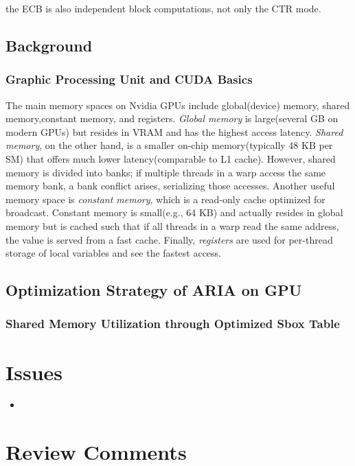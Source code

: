 \documentclass[a4paper]{article}
\begin{document}
\begin{note}
  the ECB is also independent block computations, not only the CTR mode.
\end{note}

\subsection{Background}

\subsubsection{Graphic Processing Unit and CUDA Basics}

The main memory spaces on Nvidia GPUs include global(device) memory, shared memory,constant memory, and registers. \textit{Global memory} is large(several GB on modern GPUs) but resides in VRAM and has the highest access latency. \textit{Shared memory}, on the other hand, is a smaller on-chip memory(typically 48 KB per SM) that offers much lower latency(comparable to L1 cache). However, shared memory is divided into banks; if multiple threads in a warp access the same memory bank, a bank conflict arises, serializing those accesses. Another useful memory space is \textit{constant memory}, which is a read-only cache optimized for broadcast. Constant memory is small(e.g., 64 KB) and actually resides in global memory but is cached such that if all threads in a warp read the same address, the value is served from a fast cache. Finally, \textit{registers} are used for per-thread storage of local variables and see the fastest access.

\subsection{Optimization Strategy of ARIA on GPU}
\subsubsection{Shared Memory Utilization through Optimized Sbox Table}

\section{Issues}

\begin{itemize}
  \item
\end{itemize}

\section{Review Comments}

% 
\end{document}
